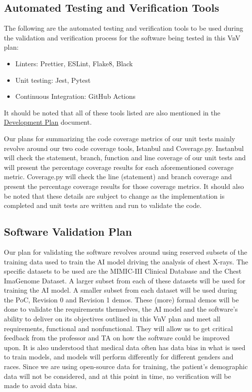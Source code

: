 \documentclass[12pt, titlepage]{article}
\begin{document}
\subsection{Automated Testing and Verification Tools}
The following are the automated testing and verification tools to be used during the validation and verification process for the software being tested in this VnV plan:
\begin{itemize}
    \item Linters: Prettier, ESLint, Flake8, Black
    \item Unit testing: Jest, Pytest
    \item Continuous Integration: GitHub Actions
\end{itemize}
It should be noted that all of these tools listed are also mentioned in the \href{https://github.com/Tusharagg1/chest-x-ray-ai/blob/main/docs/DevelopmentPlan/DevelopmentPlan.pdf}{Development Plan} document.

Our plans for summarizing the code coverage metrics of our unit tests mainly revolve around our two code coverage tools, Istanbul and Coverage.py. Instanbul will check the statement, branch, function and line coverage of our unit tests and will present the percentage coverage results for each aforementioned coverage metric. Coverage.py will check the line (statement) and branch coverage and present the percentage coverage results for those coverage metrics. It should also be noted that these details are subject to change as the implementation is completed and unit tests are written and run to validate the code.

\subsection{Software Validation Plan}
Our plan for validating the software revolves around using reserved subsets of the training data used to train the AI model driving the analysis of chest X-rays. The specific datasets to be used are the MIMIC-III Clinical Database and the Chest ImaGenome Dataset. A larger subset from each of these datasets will be used for training the AI model. A smaller subset from each dataset will be used during the PoC, Revision 0 and Revision 1 demos. These (more) formal demos will be done to validate the requirements themselves, the AI model and the software's ability to deliver on its objectives outlined in this VnV plan and meet all requirements, functional and nonfunctional. They will allow us to get critical feedback from the professor and TA on how the software could be improved upon. It is also understood that medical data often has data bias in what is used to train models, and models will perform differently for different genders and races. Since we are using open-source data for training, the patient's demographic data will not be considered, and at this point in time, no verification will be made to avoid data bias. 
\end{document}
